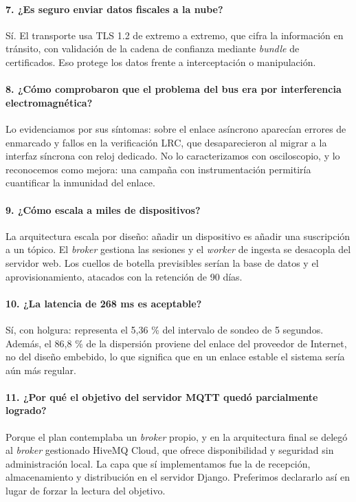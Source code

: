 \documentclass[11pt, a4paper]{article}
\begin{document}
\paragraph{7. ¿Es seguro enviar datos fiscales a la nube?}
Sí. El transporte usa TLS 1.2 de extremo a extremo, que cifra la información en tránsito, con validación de la cadena de confianza mediante \textit{bundle} de certificados. Eso protege los datos frente a interceptación o manipulación.

\paragraph{8. ¿Cómo comprobaron que el problema del bus era por interferencia electromagnética?}
Lo evidenciamos por sus síntomas: sobre el enlace asíncrono aparecían errores de enmarcado y fallos en la verificación LRC, que desaparecieron al migrar a la interfaz síncrona con reloj dedicado. No lo caracterizamos con osciloscopio, y lo reconocemos como mejora: una campaña con instrumentación permitiría cuantificar la inmunidad del enlace.

\paragraph{9. ¿Cómo escala a miles de dispositivos?}
La arquitectura escala por diseño: añadir un dispositivo es añadir una suscripción a un tópico. El \textit{broker} gestiona las sesiones y el \textit{worker} de ingesta se desacopla del servidor web. Los cuellos de botella previsibles serían la base de datos y el aprovisionamiento, atacados con la retención de 90 días.

\paragraph{10. ¿La latencia de 268 ms es aceptable?}
Sí, con holgura: representa el 5,36 \% del intervalo de sondeo de 5 segundos. Además, el 86,8 \% de la dispersión proviene del enlace del proveedor de Internet, no del diseño embebido, lo que significa que en un enlace estable el sistema sería aún más regular.

\paragraph{11. ¿Por qué el objetivo del servidor MQTT quedó parcialmente logrado?}
Porque el plan contemplaba un \textit{broker} propio, y en la arquitectura final se delegó al \textit{broker} gestionado HiveMQ Cloud, que ofrece disponibilidad y seguridad sin administración local. La capa que sí implementamos fue la de recepción, almacenamiento y distribución en el servidor Django. Preferimos declararlo así en lugar de forzar la lectura del objetivo.
\end{document}
